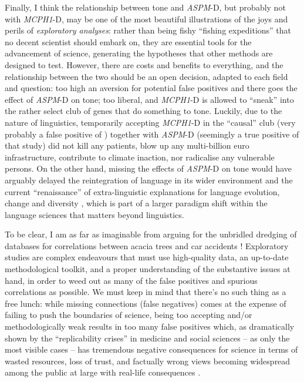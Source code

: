 \documentclass[twoside,onecolumn]{article}
\begin{document}
Finally, I think the relationship between tone and \textit{ASPM}-D, but probably not with \textit{MCPH1}-D, may be one of the most beautiful illustrations of the joys and perils of \emph{exploratory analyses}: rather than being fishy ``fishing expeditions'' that no decent scientist should embark on, they are essential tools for the advancement of science, generating the hypotheses that other methods are designed to test.
However, there are costs and benefits to everything, and the relationship between the two should be an open decision, adapted to each field and question: too high an aversion for potential false positives and there goes the effect of \textit{ASPM}-D on tone; too liberal, and \textit{MCPH1}-D is allowed to ``sneak'' into the rather select club of genes that do something to tone.
Luckily, due to the nature of linguistics, temporarily accepting \textit{MCPH1}-D in the ``causal'' club (very probably a false positive of \citealp{dediu_ladd_2007}) together with \textit{ASPM}-D (seemingly a true positive of that study) did not kill any patients, blow up any multi-billion euro infrastructure, contribute to climate inaction, nor radicalise any vulnerable persons.
On the other hand, missing the effects of \textit{ASPM}-D on tone would have arguably delayed the reintegration of language in its wider environment and the current ``renaissance'' of extra-linguistic explanations for language evolution, change and diversity \citep{blasi_human_2019,dediu_language_2017,everett_language_2016,dediu_glossa_2019,lupyan_why_2016}, which is part of a larger paradigm shift within the language sciences that matters beyond linguistics.

To be clear, I am as far as imaginable from arguing for the unbridled dredging of databases for correlations between acacia trees and car accidents \citep{ladd_correlational_2015,roberts_traffic_2013}!
Exploratory studies are complex endeavours that must use high-quality data, an up-to-date methodological toolkit, and a proper understanding of the substantive issues at hand, in order to weed out as many of the false positives and spurious correlations as possible.
We must keep in mind that there’s no such thing as a free lunch: while missing connections (false negatives) comes at the expense of failing to push the boundaries of science, being too accepting and/or methodologically weak results in too many false positives which, as dramatically shown by the ``replicability crises'' in medicine \citep{ioannidis_why_2005} and social sciences – as only the most visible cases – has tremendous negative consequences for science in terms of wasted resources, loss of trust, and factually wrong views becoming widespread among the public at large with real-life consequences \citep{bregman_humankind_2020}.
\end{document}
